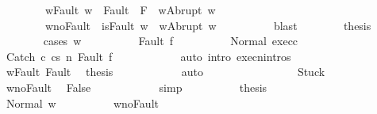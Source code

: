 \begin{isabellebody}
\ \ \ \ \ \ \ \ w{\isacharprime}{\isacharunderscore}Fault{\isacharcolon}\ {\isachardoublequoteopen}w{\isacharprime}\ {\isasymin}\ Fault\ {\isacharbackquote}\ {\isacharparenleft}{\isacharminus}F{\isacharparenright}\ {\isasymlongrightarrow}\ w{\isacharprime}{\isacharequal}Abrupt\ w{\isachardoublequoteclose}\ \isanewline
\ \ \ \ \ \ \ \ w{\isacharprime}{\isacharunderscore}noFault{\isacharcolon}\ {\isachardoublequoteopen}{\isasymnot}\ isFault\ w{\isacharprime}\ {\isasymlongrightarrow}\ w{\isacharprime}{\isacharequal}Abrupt\ w{\isachardoublequoteclose}\isanewline
\ \ \ \ \ \ \ \ \isamarkupfalse%
\ blast\isanewline
\ \ \ \ \ \ \isamarkupfalse%
\ {\isacharquery}thesis\isanewline
\ \ \ \ \ \ \isamarkupfalse%
\ {\isacharparenleft}cases\ {\isachardoublequoteopen}w{\isacharprime}{\isachardoublequoteclose}{\isacharparenright}\isanewline
\ \ \ \ \ \ \ \ \isamarkupfalse%
\ {\isacharparenleft}Fault\ f{\isacharprime}{\isacharparenright}\isanewline
\ \ \ \ \ \ \ \ \isamarkupfalse%
\ Normal\ exec{\isacharunderscore}c{}\ \isamarkupfalse%
\ {\isachardoublequoteopen}{\isasymGamma}{\isasymturnstile}{\isasymlangle}Catch\ c{}\ c{}{\isacharcomma}s{\isasymrangle}\ {\isacharequal}n{\isasymRightarrow}\ Fault\ f{\isacharprime}{\isachardoublequoteclose}\isanewline
\ \ \ \ \ \ \ \ \ \ \isamarkupfalse%
\ {\isacharparenleft}auto\ intro{\isacharcolon}\ execn{\isachardot}intros{\isacharparenright}\isanewline
\ \ \ \ \ \ \ \ \isamarkupfalse%
\ w{\isacharprime}{\isacharunderscore}Fault\ Fault\ \isamarkupfalse%
\ {\isacharquery}thesis\isanewline
\ \ \ \ \ \ \ \ \ \ \isamarkupfalse%
\ auto\isanewline
\ \ \ \ \ \ \isamarkupfalse%
\isanewline
\ \ \ \ \ \ \ \ \isamarkupfalse%
\ Stuck\isanewline
\ \ \ \ \ \ \ \ \isamarkupfalse%
\ w{\isacharprime}{\isacharunderscore}noFault\ \isamarkupfalse%
\ False\isanewline
\ \ \ \ \ \ \ \ \ \ \isamarkupfalse%
\ simp\isanewline
\ \ \ \ \ \ \ \ \isamarkupfalse%
\ {\isacharquery}thesis\ \isacommand{{\isachardot}{\isachardot}}\isamarkupfalse%
\isanewline
\ \ \ \ \ \ \isamarkupfalse%
\isanewline
\ \ \ \ \ \ \ \ \isamarkupfalse%
\ {\isacharparenleft}Normal\ w{\isacharprime}{\isacharprime}{\isacharparenright}\isanewline
\ \ \ \ \ \ \ \ \isamarkupfalse%
\ w{\isacharprime}{\isacharunderscore}noFault\ \isamarkupfalse%

\end{isabellebody}
